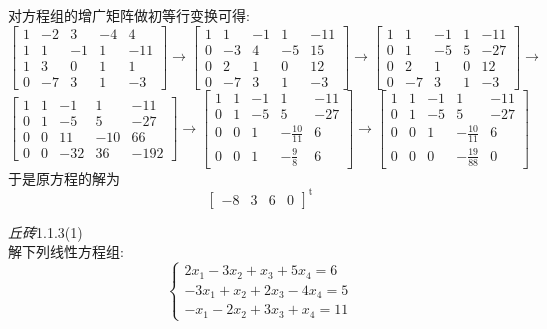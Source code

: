 \documentclass{ctexart}
\begin{document}
\begin{solution}
    对方程组的增广矩阵做初等行变换可得:
    \[\begin{bmatrix}
        1&-2&3&-4&4\\
        1&1&-1&1&-11\\
        1&3&0&1&1\\
        0&-7&3&1&-3
    \end{bmatrix}\longrightarrow\begin{bmatrix}
        1&1&-1&1&-11\\
        0&-3&4&-5&15\\
        0&2&1&0&12\\
        0&-7&3&1&-3
    \end{bmatrix}\longrightarrow\begin{bmatrix}
        1&1&-1&1&-11\\
        0&1&-5&5&-27\\
        0&2&1&0&12\\
        0&-7&3&1&-3
    \end{bmatrix}\longrightarrow\]
    \[\begin{bmatrix}
        1&1&-1&1&-11\\
        0&1&-5&5&-27\\
        0&0&11&-10&66\\
        0&0&-32&36&-192
    \end{bmatrix}\longrightarrow\begin{bmatrix}
        1&1&-1&1&-11\\
        0&1&-5&5&-27\\
        0&0&1&-\frac{10}{11}&6\\
        0&0&1&-\frac{9}{8}&6
    \end{bmatrix}\longrightarrow\begin{bmatrix}
        1&1&-1&1&-11\\
        0&1&-5&5&-27\\
        0&0&1&-\frac{10}{11}&6\\
        0&0&0&-\frac{19}{88}&0
    \end{bmatrix}\]
    于是原方程的解为
    \[\begin{bmatrix}
        -8&3&6&0
    \end{bmatrix}^{\text{t}}\]
\end{solution}
\begin{problem}\textit{丘砖}1.1.3(1)\\
    解下列线性方程组:
    \[\left\{\begin{array}{l}
        2x_1-3x_2+x_3+5x_4=6\\
        -3x_1+x_2+2x_3-4x_4=5\\
        -x_1-2x_2+3x_3+x_4=11
    \end{array}\right.\]
\end{problem}
\end{document}
